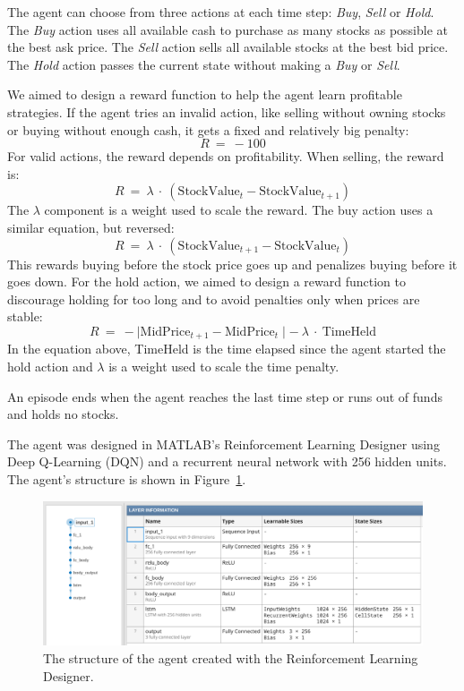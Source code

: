 \documentclass[a4paper,oneside,onecolumn,12pt]{book}
\begin{document}
	The agent can choose from three actions at each time step: \textit{Buy}, \textit{Sell} or \textit{Hold}. The \textit{Buy} action uses all available cash to purchase as many stocks as possible at the best ask price. The \textit{Sell} action sells all available stocks at the best bid price. The \textit{Hold} action passes the current state without making a \textit{Buy} or \textit{Sell}.

	We aimed to design a reward function to help the agent learn profitable strategies. If the agent tries an invalid action, like selling without owning stocks or buying without enough cash, it gets a fixed and relatively big penalty:
	\[ R\ =\ -100 \]
	For valid actions, the reward depends on profitability. When selling, the reward is:
	\[ R\ =\ \lambda\ \cdot\ (\text{StockValue}_{t} - \text{StockValue}_{t+1}) \]
	The $\lambda$ component is a weight used to scale the reward. The buy action uses a similar equation, but reversed:
	\[ R\ =\ \lambda\ \cdot\ (\text{StockValue}_{t+1} - \text{StockValue}_{t}) \]
	This rewards buying before the stock price goes up and penalizes buying before it goes down. For the hold action, we aimed to design a reward function to discourage holding for too long and to avoid penalties only when prices are stable:
	\[ R\ =\ -\mid \text{MidPrice}_{t+1} - \text{MidPrice}_{t} \mid -\ \lambda\ \cdot\ \text{TimeHeld} \]
	In the equation above, TimeHeld is the time elapsed since the agent started the hold action and $\lambda$ is a weight used to scale the time penalty.

	An episode ends when the agent reaches the last time step or runs out of funds and holds no stocks.

	The agent was designed in MATLAB's Reinforcement Learning Designer using Deep Q-Learning (DQN) and a recurrent neural network with 256 hidden units. The agent's structure is shown in Figure~\ref{fig:agent_structure}.
	
	\begin{figure}[H]
	\begin{center}
		\includegraphics[width=\linewidth]{kep/agent_structure.png}
		\caption{The structure of the agent created with the Reinforcement Learning Designer.}
		\label{fig:agent_structure}
	\end{center}
	\end{figure}
\end{document}
